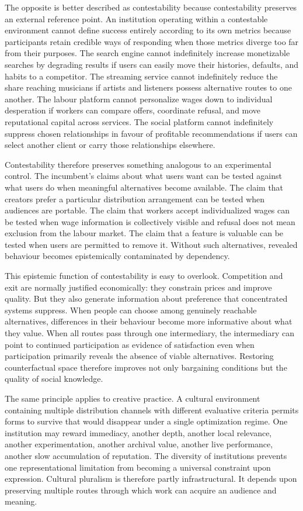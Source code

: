 \documentclass[11pt]{article}
\begin{document}
The opposite is better described as contestability because contestability preserves an external reference point. An institution operating within a contestable environment cannot define success entirely according to its own metrics because participants retain credible ways of responding when those metrics diverge too far from their purposes. The search engine cannot indefinitely increase monetizable searches by degrading results if users can easily move their histories, defaults, and habits to a competitor. The streaming service cannot indefinitely reduce the share reaching musicians if artists and listeners possess alternative routes to one another. The labour platform cannot personalize wages down to individual desperation if workers can compare offers, coordinate refusal, and move reputational capital across services. The social platform cannot indefinitely suppress chosen relationships in favour of profitable recommendations if users can select another client or carry those relationships elsewhere.

Contestability therefore preserves something analogous to an experimental control. The incumbent's claims about what users want can be tested against what users do when meaningful alternatives become available. The claim that creators prefer a particular distribution arrangement can be tested when audiences are portable. The claim that workers accept individualized wages can be tested when wage information is collectively visible and refusal does not mean exclusion from the labour market. The claim that a feature is valuable can be tested when users are permitted to remove it. Without such alternatives, revealed behaviour becomes epistemically contaminated by dependency.

This epistemic function of contestability is easy to overlook. Competition and exit are normally justified economically: they constrain prices and improve quality. But they also generate information about preference that concentrated systems suppress. When people can choose among genuinely reachable alternatives, differences in their behaviour become more informative about what they value. When all routes pass through one intermediary, the intermediary can point to continued participation as evidence of satisfaction even when participation primarily reveals the absence of viable alternatives. Restoring counterfactual space therefore improves not only bargaining conditions but the quality of social knowledge.

The same principle applies to creative practice. A cultural environment containing multiple distribution channels with different evaluative criteria permits forms to survive that would disappear under a single optimization regime. One institution may reward immediacy, another depth, another local relevance, another experimentation, another archival value, another live performance, another slow accumulation of reputation. The diversity of institutions prevents one representational limitation from becoming a universal constraint upon expression. Cultural pluralism is therefore partly infrastructural. It depends upon preserving multiple routes through which work can acquire an audience and meaning.
\end{document}
